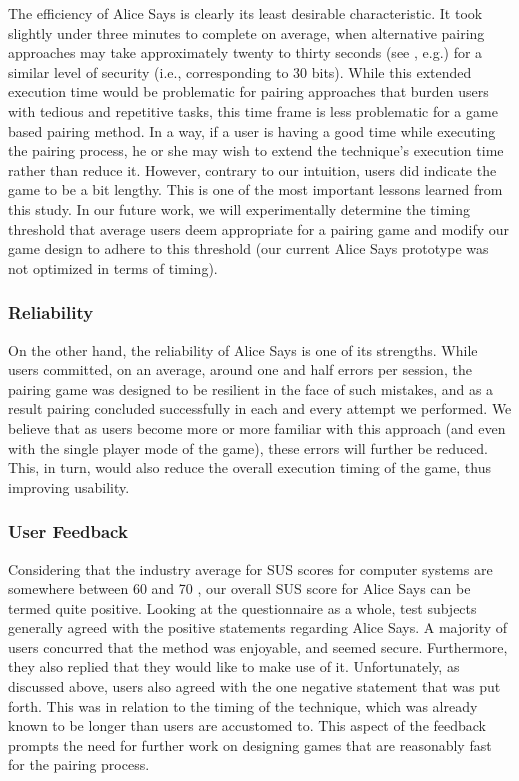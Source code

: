 The efficiency of Alice Says is clearly its least desirable characteristic. It
took slightly under three minutes to complete on average, when alternative
pairing approaches may take approximately twenty to thirty seconds (see
\cite{kstu09}, e.g.) for a similar level of security (i.e., corresponding to 30
bits). While this extended execution time would be problematic for pairing
approaches that burden users with tedious and repetitive tasks, this time frame
is less problematic for a game based pairing method. In a way, if a user is
having a good time while executing the pairing process, he or she may wish to
extend the technique's execution time rather than reduce it. However, contrary
to our intuition, users did indicate the game to be a bit lengthy. This is one
of the most important lessons learned from this study. In our future work, we
will experimentally determine the timing threshold that average users deem
appropriate for a pairing game and modify our game design to adhere to this
threshold (our current Alice Says prototype was not optimized in terms of
timing). 




\subsubsection{Reliability}

On the other hand, the reliability of Alice Says is one of its strengths. While
users committed, on an average, around one and half errors per session, the
pairing game was designed to be resilient in the face of such mistakes, and as
a result pairing concluded successfully in each and every attempt we performed.
We believe that as users become more or more familiar with this approach (and
even with the single player mode of the game), these errors will further be
reduced. This, in turn, would also reduce the overall execution timing of the
game, thus improving usability.

\subsubsection{User Feedback}

Considering that the industry average for SUS scores for computer systems are
somewhere between 60 and 70 \cite{sus-ratings}, our overall SUS score for Alice
Says can be termed quite positive. Looking at the questionnaire as a whole,
test subjects generally agreed with the positive statements regarding Alice
Says.  A majority of users concurred that the method was enjoyable, and seemed
secure. Furthermore, they also replied that they would like to make use of it.
Unfortunately, as discussed above, users also agreed with the one negative
statement that was put forth. This was in relation to the timing of the
technique, which was already known to be longer than users are accustomed to.
This aspect of the feedback prompts the need for further work on designing
games that are reasonably fast for the pairing process. 

